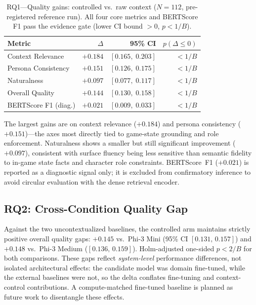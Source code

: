 \documentclass[conference]{IEEEtran}
\begin{document}
\begin{table}[!t]
\renewcommand{\arraystretch}{1.15}
\caption{RQ1---Quality gains: controlled vs.\ raw context ($N=112$,
pre-registered reference run). All four core metrics and BERTScore
F1 pass the evidence gate (lower CI bound $>0$, $p{<}1/B$).}
\label{tab:core}
\centering
\setlength{\tabcolsep}{3pt}
\begin{tabular}{lrrr}
\toprule
Metric & $\Delta$ & 95\% CI & $p(\Delta\le0)$ \\
\midrule
Context Relevance    & $+0.184$ & $[0.165,\;0.203]$ & ${<}1/B$ \\
Persona Consistency  & $+0.151$ & $[0.126,\;0.175]$ & ${<}1/B$ \\
Naturalness          & $+0.097$ & $[0.077,\;0.117]$ & ${<}1/B$ \\
Overall Quality      & $+0.144$ & $[0.130,\;0.158]$ & ${<}1/B$ \\
BERTScore F1 (diag.) & $+0.021$ & $[0.009,\;0.033]$ & ${<}1/B$ \\
\bottomrule
\end{tabular}
\end{table}

The largest gains are on context relevance ($+0.184$) and persona
consistency ($+0.151$)---the axes most directly tied to game-state
grounding and role enforcement. Naturalness shows a smaller but
still significant improvement ($+0.097$), consistent with surface
fluency being less sensitive than semantic fidelity to in-game state
facts and character role constraints. BERTScore~F1 ($+0.021$) is
reported as a diagnostic signal only; it is excluded from
confirmatory inference to avoid circular evaluation with the
dense retrieval encoder.

\subsection{RQ2: Cross-Condition Quality Gap}

Against the two uncontextualized baselines, the controlled arm
maintains strictly positive overall quality gaps: $+0.145$
vs.\ Phi-3 Mini (95\% CI $[0.131,\,0.157]$) and $+0.148$
vs.\ Phi-3 Medium ($[0.136,\,0.159]$). Holm-adjusted one-sided
$p{<}2/B$ for both comparisons. These gaps reflect
\textit{system-level} performance differences, not isolated
architectural effects: the candidate model was domain
fine-tuned, while the external baselines were not, so the
delta conflates fine-tuning and context-control contributions.
A compute-matched fine-tuned baseline is planned as future
work to disentangle these effects.
\end{document}
